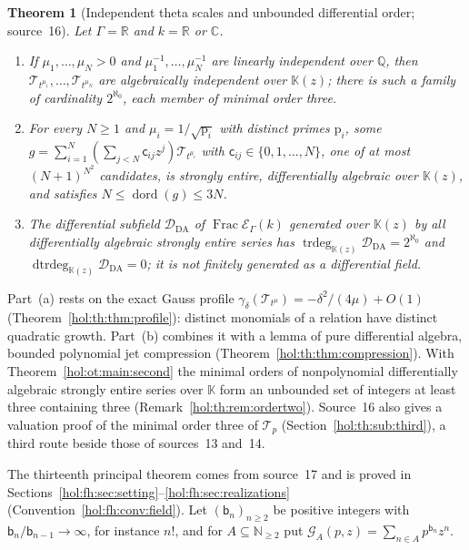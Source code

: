 \documentclass[11pt]{article}
\numberwithin{equation}{section}
\newtheorem{maintheorem}{Theorem}
\theoremstyle{definition}
\theoremstyle{remark}
\newcommand{\C}{\mathbb C}
\newcommand{\R}{\mathbb R}
\newcommand{\Q}{\mathbb Q}
\newcommand{\N}{\mathbb N}
\newcommand{\KK}{\mathbb K}
\newcommand{\EK}{\mathcal E_\Gamma(k)}
\newcommand{\FE}{\operatorname{Frac}\EK}
\newcommand{\trdeg}{\operatorname{trdeg}}
\newcommand{\dtrdeg}{\operatorname{dtrdeg}}
\begin{document}
\begin{maintheorem}[Independent theta scales and unbounded differential order;
source~16]\label{hol:th:main:hierarchy}
Let $\Gamma=\R$ and $k=\R$ or $\C$.
\begin{enumerate}[label=\textup{(\alph*)}]
\item If $\mu_1,\ldots,\mu_N>0$ and $\mu_1^{-1},\ldots,\mu_N^{-1}$ are linearly
independent over $\Q$, then $\mathcal T_{t^{\mu_1}},\ldots,\mathcal T_{t^{\mu_N}}$
are algebraically independent over $\KK(z)$; there is such a family of
cardinality $2^{\aleph_0}$, each member of minimal order three.
\item For every $N\ge1$ and $\mu_i=1/\sqrt{\mathrm p_i}$ with distinct primes
$\mathrm p_i$, some $g=\sum_{i=1}^N(\sum_{j<N}\mathsf c_{ij}z^j)\mathcal
T_{t^{\mu_i}}$ with $\mathsf c_{ij}\in\{0,1,\ldots,N\}$, one of at most
$(N+1)^{N^2}$ candidates, is strongly entire, differentially algebraic over
$\KK(z)$, and satisfies $N\le\operatorname{dord}(g)\le3N$.
\item The differential subfield $\mathcal D_{\mathrm{DA}}$ of $\FE$ generated
over $\KK(z)$ by all differentially algebraic strongly entire series has
$\trdeg_{\KK(z)}\mathcal D_{\mathrm{DA}}=2^{\aleph_0}$ and
$\dtrdeg_{\KK(z)}\mathcal D_{\mathrm{DA}}=0$; it is not finitely generated as a
differential field.
\end{enumerate}
\end{maintheorem}

Part~(a) rests on the exact Gauss profile
$\gamma_\delta(\mathcal T_{t^\mu})=-\delta^2/(4\mu)+O(1)$
(Theorem~\ref{hol:th:thm:profile}): distinct monomials of a relation have
distinct quadratic growth. Part~(b) combines it with a lemma of pure
differential algebra, bounded polynomial jet compression
(Theorem~\ref{hol:th:thm:compression}). With Theorem~\ref{hol:ot:main:second}
the minimal orders of nonpolynomial differentially algebraic strongly entire
series over $\KK$ form an unbounded set of integers at least three containing
three (Remark~\ref{hol:th:rem:ordertwo}). Source~16 also gives a valuation
proof of the minimal order three of $\mathcal T_p$
(Section~\ref{hol:th:sub:third}), a third route beside those of sources~13
and~14.

The thirteenth principal theorem comes from source~17 and is proved in
Sections~\ref{hol:fh:sec:setting}--\ref{hol:fh:sec:realizations}
(Convention~\ref{hol:fh:conv:field}). Let $(\mathsf b_n)_{n\ge2}$ be positive
integers with $\mathsf b_n/\mathsf b_{n-1}\to\infty$, for instance $n!$, and
for $A\subseteq\N_{\ge2}$ put $\mathcal G_A(p,z)=\sum_{n\in A}p^{\mathsf b_n}z^n$.
\end{document}
